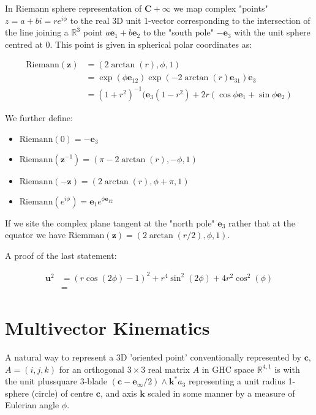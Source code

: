 \documentclass[a4paper]{book}
\numberwithin{equation}{chapter}
\begin{document}
 In Riemann sphere representation of $\mathbf{C}+\infty$ we map complex "points" $z=a+bi=re^{i\phi}$
 to the real 3D unit 1-vector corresponding to the intersection of the line joining a $\mathbb{R}^3$ point
 $a\mathbf{e}_1+b\mathbf{e}_2$ to the "south pole" $-\mathbf{e}_3$ with the unit sphere centred at 0. 
 This point is given in spherical polar coordinates as:

\begin{tcolorbox}[colback=white, colframe=blue!40!black, title=\textbf{Riemman projection rules} ]

 \begin{align}
     \text{Riemann}(\mathbf{z}) &= (2 \arctan(r), \phi, 1) \\ 
     &= \exp(\phi\mathbf{e}_{12})\exp(-2 \arctan(r)\mathbf{e}_{31})\mathbf{e}_3 \\
     &= (1+r^2)^{-1}( \mathbf{e}_3(1-r^2) + 2r(\cos \phi \mathbf{e}_1 + \sin \phi \mathbf{e}_2)
    \end{align}

We further define:

\begin{itemize}
    \item $\text{Riemann}(0) = -\mathbf{e}_3$
    \item $\text{Riemann}(\mathbf{z}^{-1}) = (\pi-2 \arctan(r), -\phi, 1)$
    \item $\text{Riemann}(-\mathbf{z}) = (2 \arctan(r), \phi+\pi,1)$
    \item $\text{Riemann}(e^{i\phi}) = \mathbf{e}_1 e^{\phi \mathbf{e}_{12}} $
\end{itemize}

If we site the complex plane tangent at the "north pole" $\mathbf{e}_3$
rather that at the equator we have $\text{Riemman}(\mathbf{z}) = ( 2 \arctan(r/2), \phi,1)$.  

\end{tcolorbox} 

A proof of the last statement:

\begin{align*}
    \mathbf{u}^2 &= (r \cos(2\phi)-1)^2+r^4 \sin^2(2\phi) + 4r^2\cos^2(\phi) \\
    &=
\end{align*}


\section{Multivector Kinematics}

A natural way to represent a 3D 'oriented point' conventionally represented by $\mathbf{c}$, 
$A=(i,j,k)$ for an orthogonal $3\times3$ real matrix $A$ in GHC space $\mathbb{R}^{4,1}$ 
is with the unit plussquare 3-blade $(\mathbf{c}-\mathbf{e}_{\infty}/2)\wedge \mathbf{k}^*a_3$
representing a unit radius 1-sphere (circle) of centre $\mathbf{c}$, and axis $\mathbf{k}$ 
scaled in some manner by a measure of Eulerian angle $\phi$. 
\end{document}
